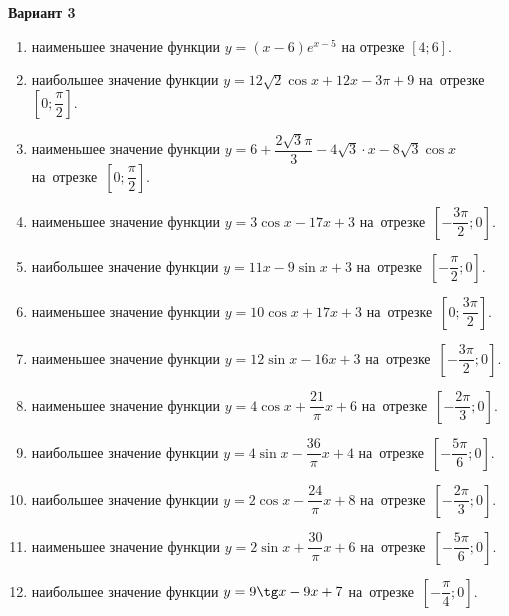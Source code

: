 \documentclass[a4paper,10pt]{article}
\begin{document}
\begin{center}\Large\textbf{Вариант 3}\end{center}

\begin{enumerate}
\item {} наименьшее значение функции $y=\left(x-6\right)e^{x-5}$ на отрезке $\left[4;6\right]$.

\item {} наибольшее значение функции $y=12\sqrt{2}\cos x+12x-3\pi +9$ на~отрезке~$\left[0;\dfrac{\pi }{2}\right]$.

\item {} наименьшее значение функции $y=6+\dfrac{2\sqrt{3}\pi}{3}-4\sqrt{3}\cdot x-8\sqrt{3}\cos x$ на~отрезке~$\left[0;\dfrac{\pi }{2}\right]$.

\item {} наименьшее значение функции $y=3\cos x-17x+3$ на~отрезке~$\left[-\dfrac{3\pi }{2};0\right]$.

\item {} наибольшее значение функции $y=11x-9\sin x+3$ на~отрезке~$\left[-\dfrac{\pi }{2};0\right]$.

\item {} наименьшее значение функции $y=10\cos x+17x+3$ на~отрезке~$\left[0;\dfrac{3\pi }{2}\right]$.

\item {} наименьшее значение функции $y=12\sin x-16x+3$ на~отрезке~$\left[-\dfrac{3\pi }{2};0\right]$.

\item {} наименьшее значение функции $y=4\cos x+\dfrac{21}{\pi }x+6$ на~отрезке~$\left[-\dfrac{2\pi }{3};0\right]$.

\item {} наибольшее значение функции $y=4\sin x-\dfrac{36}{\pi }x+4$ на~отрезке~$\left[-\dfrac{5\pi }{6};0\right]$.

\item {} наибольшее значение функции $y=2\cos x-\dfrac{24}{\pi }x+8$ на~отрезке~$\left[-\dfrac{2\pi }{3};0\right]$.

\item {} наименьшее значение функции $y=2\sin x+\dfrac{30}{\pi }x+6$ на~отрезке~$\left[-\dfrac{5\pi }{6};0\right]$.

\item {} наибольшее значение функции $y=9\tg x-9x+7$ на~отрезке~$\left[-\dfrac{\pi }{4};0\right]$.


\end{enumerate}
\end{document}
